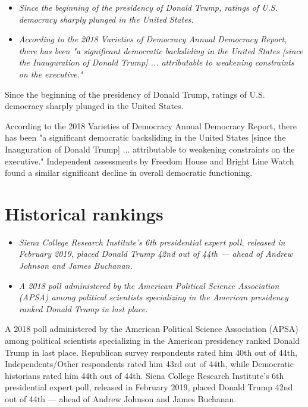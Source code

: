 \begin{itemize}
\item
  \emph{Since the beginning of the presidency of Donald Trump, ratings
  of U.S. democracy sharply plunged in the United States.}
\item
  \emph{According to the 2018 Varieties of Democracy Annual Democracy
  Report, there has been "a significant democratic backsliding in the
  United States {[}since the Inauguration of Donald Trump{]} ...
  attributable to weakening constraints on the executive."}
\end{itemize}

Since the beginning of the presidency of Donald Trump, ratings of U.S.
democracy sharply plunged in the United States.

According to the 2018 Varieties of Democracy Annual Democracy Report,
there has been "a significant democratic backsliding in the United
States {[}since the Inauguration of Donald Trump{]} ... attributable to
weakening constraints on the executive." Independent assessments by
Freedom House and Bright Line Watch found a similar significant decline
in overall democratic functioning.

\section{Historical rankings}\label{historical-rankings}

\begin{itemize}
\item
  \emph{Siena College Research Institute's 6th presidential expert poll,
  released in February 2019, placed Donald Trump 42nd out of 44th ---
  ahead of Andrew Johnson and James Buchanan.}
\item
  \emph{A 2018 poll administered by the American Political Science
  Association (APSA) among political scientists specializing in the
  American presidency ranked Donald Trump in last place.}
\end{itemize}

A 2018 poll administered by the American Political Science Association
(APSA) among political scientists specializing in the American
presidency ranked Donald Trump in last place. Republican survey
respondents rated him 40th out of 44th, Independents/Other respondents
rated him 43rd out of 44th, while Democratic historians rated him 44th
out of 44th. Siena College Research Institute's 6th presidential expert
poll, released in February 2019, placed Donald Trump 42nd out of 44th
--- ahead of Andrew Johnson and James Buchanan.

